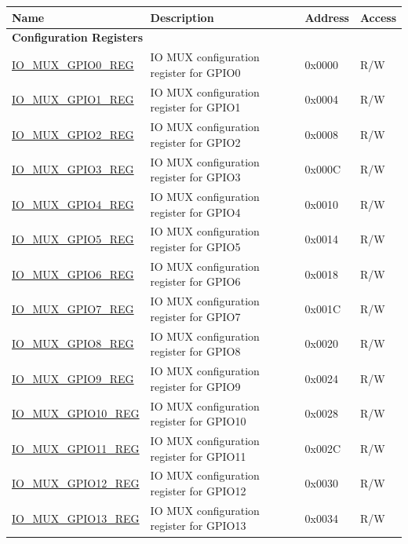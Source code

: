 \begin{longtable}{ | p{6cm} | p{7.2cm} | p{1.3cm} | p{1cm} | }
\hline\rowcolor{lightgray}
\textbf{Name} & \textbf{Description} &  \textbf{Address} & \textbf{Access} \\ \hline
\endhead
\multicolumn{4}{|l|}{\textbf{Configuration Registers}} \\ \hline
\hyperref[regdesc:IOMUXGPIONREG]{IO\_MUX\_GPIO0\_REG} & IO MUX configuration register for GPIO0 & 0x0000 & R/W \\ \hline
\hyperref[regdesc:IOMUXGPIONREG]{IO\_MUX\_GPIO1\_REG} & IO MUX configuration register for GPIO1 & 0x0004 & R/W \\ \hline
\hyperref[regdesc:IOMUXGPIONREG]{IO\_MUX\_GPIO2\_REG} & IO MUX configuration register for GPIO2 & 0x0008 & R/W \\ \hline
\hyperref[regdesc:IOMUXGPIONREG]{IO\_MUX\_GPIO3\_REG} & IO MUX configuration register for GPIO3 & 0x000C & R/W \\ \hline
\hyperref[regdesc:IOMUXGPIONREG]{IO\_MUX\_GPIO4\_REG} & IO MUX configuration register for GPIO4 & 0x0010 & R/W \\ \hline
\hyperref[regdesc:IOMUXGPIONREG]{IO\_MUX\_GPIO5\_REG} & IO MUX configuration register for GPIO5 & 0x0014 & R/W \\ \hline
\hyperref[regdesc:IOMUXGPIONREG]{IO\_MUX\_GPIO6\_REG} & IO MUX configuration register for GPIO6 & 0x0018 & R/W \\ \hline
\hyperref[regdesc:IOMUXGPIONREG]{IO\_MUX\_GPIO7\_REG} & IO MUX configuration register for GPIO7 & 0x001C & R/W \\ \hline
\hyperref[regdesc:IOMUXGPIONREG]{IO\_MUX\_GPIO8\_REG} & IO MUX configuration register for GPIO8 & 0x0020 & R/W \\ \hline
\hyperref[regdesc:IOMUXGPIONREG]{IO\_MUX\_GPIO9\_REG} & IO MUX configuration register for GPIO9 & 0x0024 & R/W \\ \hline
\hyperref[regdesc:IOMUXGPIONREG]{IO\_MUX\_GPIO10\_REG} & IO MUX configuration register for GPIO10 & 0x0028 & R/W \\ \hline
\hyperref[regdesc:IOMUXGPIONREG]{IO\_MUX\_GPIO11\_REG} & IO MUX configuration register for GPIO11 & 0x002C & R/W \\ \hline
\hyperref[regdesc:IOMUXGPIONREG]{IO\_MUX\_GPIO12\_REG} & IO MUX configuration register for GPIO12 & 0x0030 & R/W \\ \hline
\hyperref[regdesc:IOMUXGPIONREG]{IO\_MUX\_GPIO13\_REG} & IO MUX configuration register for GPIO13 & 0x0034 & R/W \\ \hline

\end{longtable}
